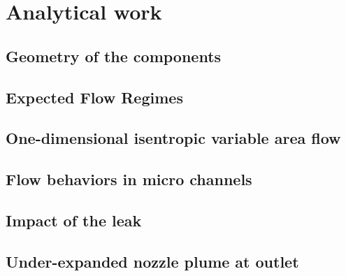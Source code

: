 \section{Analytical work}


\subsection{Geometry of the components}\label{sec:geometry}


\subsection{Expected Flow Regimes}\label{sec:expected-flow-regimes}

\newpage

\subsection{One-dimensional isentropic variable area flow}\label{sec:one-dim-isentropic}

\newpage

\subsection{Flow behaviors in micro channels}\label{sec:micro-channels}

\newpage

\subsection{Impact of the leak}

\newpage

\subsection{Under-expanded nozzle plume at outlet}

\newpage
